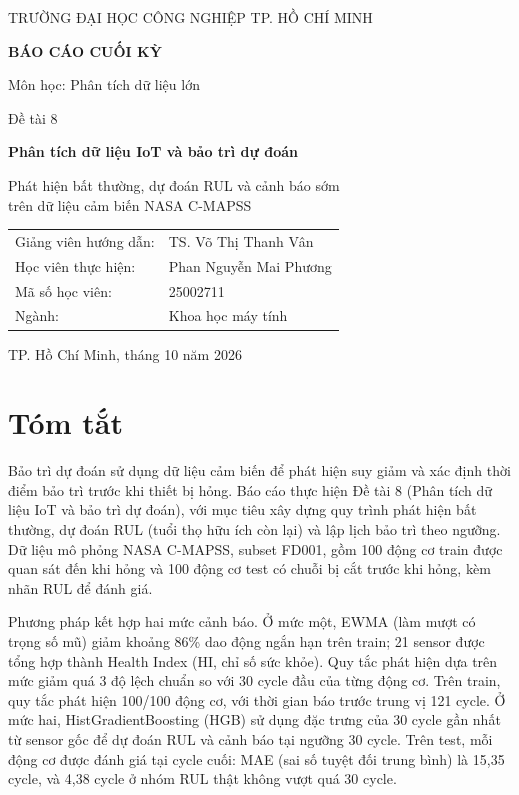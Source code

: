 \documentclass[11pt,a4paper]{article}
\begin{document}
\hypersetup{pageanchor=false}
\begin{titlepage}
\centering
{\large TRƯỜNG ĐẠI HỌC CÔNG NGHIỆP TP. HỒ CHÍ MINH\par}
\vspace{1.8cm}
{\Large\bfseries BÁO CÁO CUỐI KỲ\par}
\vspace{0.4cm}
{\large Môn học: Phân tích dữ liệu lớn\par}
\vspace{1.5cm}
{\large Đề tài 8\par}
\vspace{0.3cm}
{\LARGE\bfseries Phân tích dữ liệu IoT và bảo trì dự đoán\par}
\vspace{0.6cm}
{\Large Phát hiện bất thường, dự đoán RUL và cảnh báo sớm\\ trên dữ liệu cảm biến NASA C-MAPSS\par}
\vspace{1.5cm}
\begin{tabular}{ll}
Giảng viên hướng dẫn: & TS. Võ Thị Thanh Vân\\
Học viên thực hiện: & Phan Nguyễn Mai Phương\\
Mã số học viên: & 25002711\\
Ngành: & Khoa học máy tính
\end{tabular}
\vfill
{\normalsize TP. Hồ Chí Minh, tháng 10 năm 2026\par}
\end{titlepage}
\hypersetup{pageanchor=true}
\section*{Tóm tắt}
Bảo trì dự đoán sử dụng dữ liệu cảm biến để phát hiện suy giảm và xác định thời
điểm bảo trì trước khi thiết bị hỏng. Báo cáo thực hiện Đề tài 8 (Phân tích dữ liệu
IoT và bảo trì dự đoán), với mục tiêu xây dựng quy trình phát hiện bất thường,
dự đoán RUL (tuổi thọ hữu ích còn lại) và lập lịch bảo trì theo ngưỡng. Dữ liệu mô phỏng
NASA C-MAPSS, subset FD001, gồm 100 động cơ train được quan sát đến khi hỏng và
100 động cơ test có chuỗi bị cắt trước khi hỏng, kèm nhãn RUL để đánh giá.

Phương pháp kết hợp hai mức cảnh báo. Ở mức một, EWMA (làm mượt có trọng số mũ)
giảm khoảng 86\% dao động ngắn hạn trên train; 21 sensor được tổng hợp thành Health Index
(HI, chỉ số sức khỏe). Quy tắc phát hiện dựa trên mức giảm quá 3 độ lệch chuẩn so
với 30 cycle đầu của từng động cơ. Trên train, quy tắc phát hiện 100/100 động cơ,
với thời gian báo trước trung vị 121 cycle. Ở mức hai, HistGradientBoosting (HGB)
sử dụng đặc trưng của 30 cycle gần nhất từ sensor gốc để dự đoán RUL và cảnh báo
tại ngưỡng 30 cycle. Trên test, mỗi động cơ được đánh giá tại cycle cuối: MAE
(sai số tuyệt đối trung bình) là 15,35 cycle, và 4,38 cycle ở nhóm RUL thật không
vượt quá 30 cycle.
\end{document}
